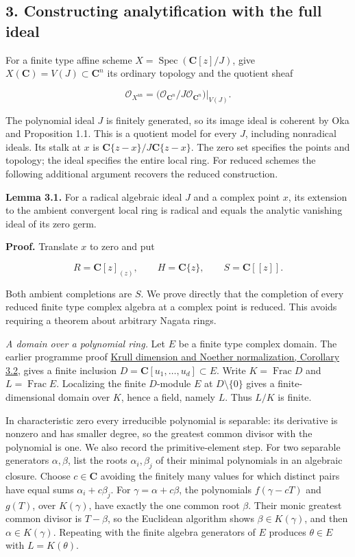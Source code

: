 \documentclass[11pt]{article}
\begin{document}
\subsection{3. Constructing analytification with the full
ideal}\label{constructing-analytification-with-the-full-ideal}

For a finite type affine scheme
\(X=\operatorname{Spec}(\mathbf C[z]/J)\), give
\(X(\mathbf C)=V(J)\subset\mathbf C^n\) its ordinary topology and the
quotient sheaf

\[
\mathcal O_{X^{\mathrm{an}}}
=\bigl(\mathcal O_{\mathbf C^n}/J\mathcal O_{\mathbf C^n}\bigr)|_{V(J)}.
\]

The polynomial ideal \(J\) is finitely generated, so its image ideal is
coherent by Oka and Proposition 1.1. This is a quotient model for every
\(J\), including nonradical ideals. Its stalk at \(x\) is
\(\mathbf C\{z-x\}/J\mathbf C\{z-x\}\). The zero set specifies the
points and topology; the ideal specifies the entire local ring. For
reduced schemes the following additional argument recovers the reduced
construction.

\textbf{Lemma 3.1.} For a radical algebraic ideal \(J\) and a complex
point \(x\), its extension to the ambient convergent local ring is
radical and equals the analytic vanishing ideal of its zero germ.

\textbf{Proof.} Translate \(x\) to zero and put

\[
R=\mathbf C[z]_{(z)},\qquad H=\mathbf C\{z\},\qquad S=\mathbf C[[z]].
\]

Both ambient completions are \(S\). We prove directly that the
completion of every reduced finite type complex algebra at a complex
point is reduced. This avoids requiring a theorem about arbitrary Nagata
rings.

\emph{A domain over a polynomial ring.} Let \(E\) be a finite type
complex domain. The earlier programme proof
\href{../AG-CA/AG-CA-09.html\#3-normalization-that-respects-ideals}{Krull
dimension and Noether normalization, Corollary 3.2}, gives a finite
inclusion \(D=\mathbf C[u_1,\ldots,u_d]\subset E\). Write
\(K=\operatorname{Frac}D\) and \(L=\operatorname{Frac}E\). Localizing
the finite \(D\)-module \(E\) at \(D\setminus\{0\}\) gives a
finite-dimensional domain over \(K\), hence a field, namely \(L\). Thus
\(L/K\) is finite.

In characteristic zero every irreducible polynomial is separable: its
derivative is nonzero and has smaller degree, so the greatest common
divisor with the polynomial is one. We also record the primitive-element
step. For two separable generators \(\alpha,\beta\), list the roots
\(\alpha_i,\beta_j\) of their minimal polynomials in an algebraic
closure. Choose \(c\in\mathbf C\) avoiding the finitely many values for
which distinct pairs have equal sums \(\alpha_i+c\beta_j\). For
\(\gamma=\alpha+c\beta\), the polynomials \(f(\gamma-cT)\) and \(g(T)\),
over \(K(\gamma)\), have exactly the one common root \(\beta\). Their
monic greatest common divisor is \(T-\beta\), so the Euclidean algorithm
shows \(\beta\in K(\gamma)\), and then \(\alpha\in K(\gamma)\).
Repeating with the finite algebra generators of \(E\) produces
\(\theta\in E\) with \(L=K(\theta)\).
\end{document}
